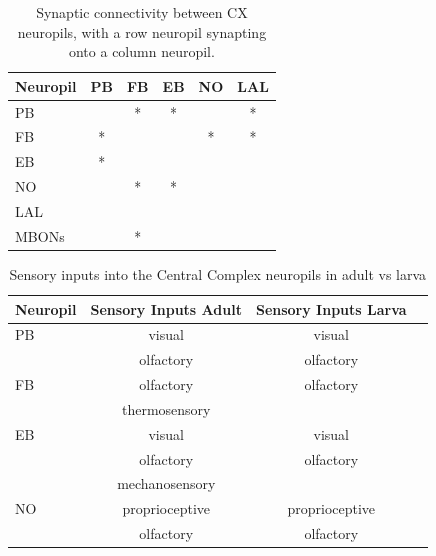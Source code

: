 \documentclass{article}
\begin{document}
    \begin{table}

    \begin{tabular}{l|ccccc}
        \toprule
        Neuropil & PB & FB & EB & NO & LAL \\
        \midrule
        PB &  & * & * &  & * \\
        FB & * & & & * & * \\
        EB & * & & & & \\
        NO & & * & * & & \\
        LAL & & & & & \\ %
        MBONs & & * & & & \\
        \bottomrule
    \end{tabular}
    
    \caption{Synaptic connectivity between CX neuropils, with a row neuropil synapting onto a column neuropil.}
    \label{inputsoutputs}
    \end{table}
    
    \begin{table}
    \centering
        \begin{tabular}{ lccr } 
         \toprule
         Neuropil &  Sensory Inputs Adult & Sensory Inputs Larva   \\ 
        \midrule
            PB & visual & visual\\
               & olfactory & olfactory \\
        \hline
            FB & olfactory & olfactory \\ 
               & thermosensory        & \\  %
        \hline
            EB &  visual  & visual  \\
               &  olfactory  & olfactory  \\
               &  mechanosensory  &   \\
        \hline
            NO &  proprioceptive  & proprioceptive  \\
              &  olfactory  &  olfactory \\

        \bottomrule
    \end{tabular}
    \caption{Sensory inputs into the Central Complex neuropils in adult vs larva}
    \label{sensoryinputs}
    \end{table}
\end{document}

